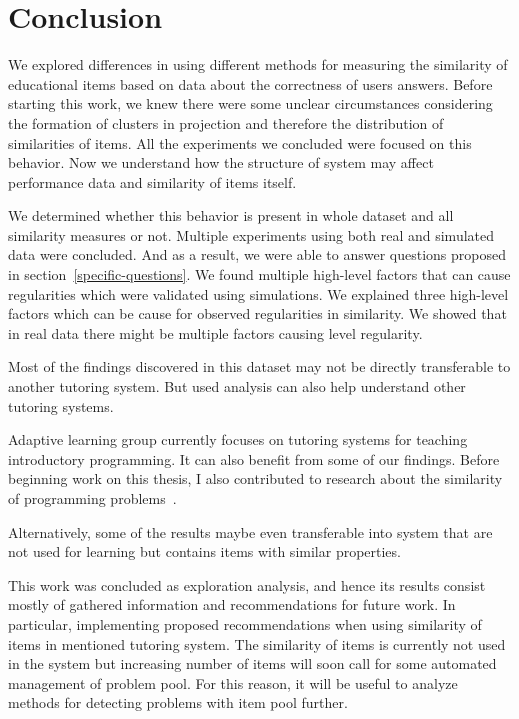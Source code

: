 \documentclass[
  printed, %
  table,   %
  nolof,     %
  nolot,     %
  color,
  final,
  nocover
]{fithesis3}
\begin{document}
\chapter{Conclusion}


We explored differences in using different methods for measuring the similarity of educational items based on data about the correctness of users answers. Before starting this work, we knew there were some unclear circumstances considering the formation of clusters in projection and therefore the distribution of similarities of items. All the experiments we concluded were focused on this behavior. Now we understand how the structure of system may affect performance data and similarity of items itself.

We determined whether this behavior is present in whole dataset and all similarity measures or not. Multiple experiments using both real and simulated data were concluded. And as a result, we were able to answer questions proposed in section~\ref{specific-questions}. We found multiple high-level factors that can cause regularities which were validated using simulations. We explained three high-level factors which can be cause for observed regularities in similarity. We showed that in real data there might be multiple factors causing level regularity.

Most of the findings discovered in this dataset may not be directly transferable to another tutoring system. But used analysis can also help understand other tutoring systems.


Adaptive learning group currently focuses on tutoring systems for teaching introductory programming. It can also benefit from some of our findings. Before beginning work on this thesis, I also contributed to research about the similarity of programming problems~\cite{pelanek2018programming}.

Alternatively, some of the results maybe even transferable into system that are not used for learning but contains items with similar properties.


This work was concluded as exploration analysis, and hence its results consist mostly of gathered information and recommendations for future work. In particular, implementing proposed recommendations when using similarity of items in mentioned tutoring system. The similarity of items is currently not used in the system \umimeCesky{} but increasing number of items will soon call for some automated management of problem pool. For this reason, it will be useful to analyze methods for detecting problems with item pool further.
\end{document}
